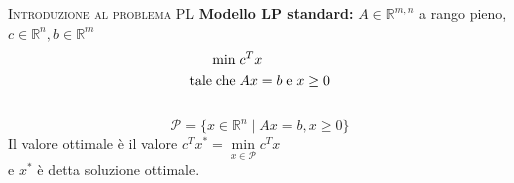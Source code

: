 
\begin{frame}[t,plain]
\titlepage
\end{frame}
%
%
\begin{frame}[t]{\textsc{Introduzione al problema PL}}
\textbf{Modello LP standard:} $A \in \mathbb{R}^{m,n}$ a rango pieno, $c\in \mathbb{R}^{n}, b \in \mathbb{R}^{m}$\\
\begin{equation*}
\begin{split}
\min\;&c^{T}x\\
\text{tale\;che\;}&Ax= b\;\text{e\;}x\geq0
\end{split}
\end{equation*}
\pause
{}\\
\begin{equation*}
\mathcal{P}=\lbrace x\in\mathbb{R}^{n}\; |\; Ax = b , x \geq0\rbrace
\end{equation*}
Il valore ottimale è il valore $c^{T}x^{*}=\min\limits_{x\in\mathcal{P}}c^{T}x$
\\ e $x^{*}$ è detta soluzione ottimale.
\end{frame}

